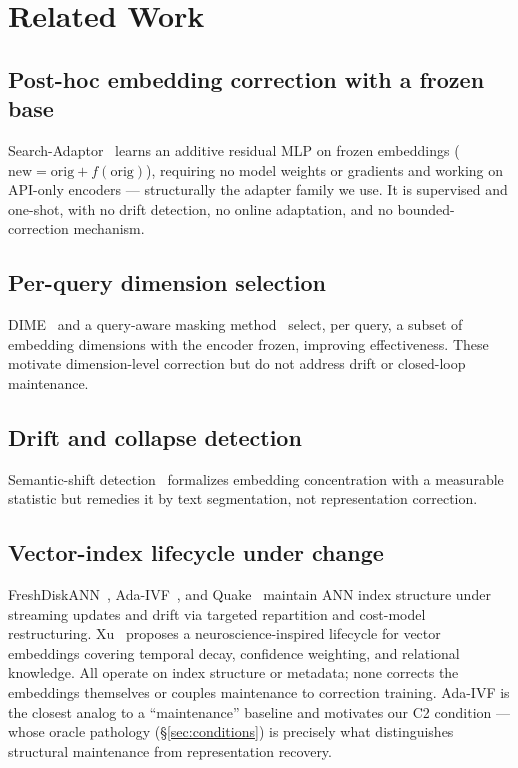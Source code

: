 \documentclass[12pt]{article}
\begin{document}
\section{Related Work}
\label{sec:related}

\subsection{Post-hoc embedding correction with a frozen base}
\label{sec:related-posthoc}

Search-Adaptor~\cite{searchadaptor} learns an additive residual MLP on frozen embeddings ($\mathrm{new} = \mathrm{orig} + f(\mathrm{orig})$), requiring no model weights or gradients and working on API-only encoders --- structurally the adapter family we use. It is supervised and one-shot, with no drift detection, no online adaptation, and no bounded-correction mechanism.

\subsection{Per-query dimension selection}
\label{sec:related-dim}

DIME~\cite{dime2024} and a query-aware masking method~\cite{queryawasking2026} select, per query, a subset of embedding dimensions with the encoder frozen, improving effectiveness. These motivate dimension-level correction but do not address drift or closed-loop maintenance.

\subsection{Drift and collapse detection}
\label{sec:related-drift}

Semantic-shift detection~\cite{semshift2026} formalizes embedding concentration with a measurable statistic but remedies it by text segmentation, not representation correction.

\subsection{Vector-index lifecycle under change}
\label{sec:related-lifecycle}

FreshDiskANN~\cite{freshdiskann2021}, Ada-IVF~\cite{adaivf2024}, and Quake~\cite{quake2026} maintain ANN index structure under streaming updates and drift via targeted repartition and cost-model restructuring. Xu~\cite{selfawaredvec2026} proposes a neuroscience-inspired lifecycle for vector embeddings covering temporal decay, confidence weighting, and relational knowledge. All operate on index structure or metadata; none corrects the embeddings themselves or couples maintenance to correction training. Ada-IVF is the closest analog to a ``maintenance'' baseline and motivates our C2 condition --- whose oracle pathology (\S\ref{sec:conditions}) is precisely what distinguishes structural maintenance from representation recovery.
\end{document}
